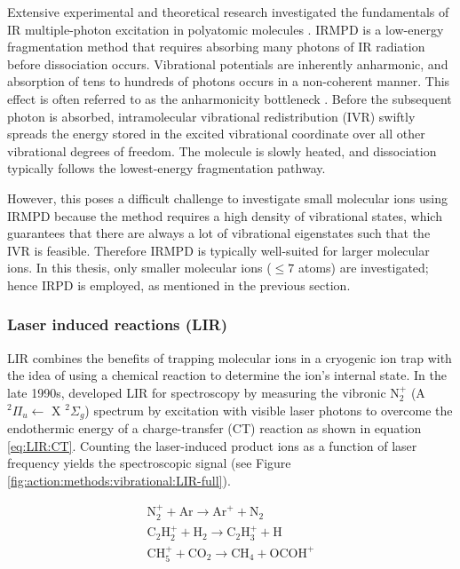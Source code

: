 Extensive experimental and theoretical research investigated the fundamentals of IR multiple-photon excitation in polyatomic molecules \cite{black_collisionless_1977, makarov_statistical_1998, oomens_gas-phase_2006, parneix_accurate_2013}. IRMPD is a low-energy fragmentation method that requires absorbing many photons of IR radiation before dissociation occurs. Vibrational potentials are inherently anharmonic, and absorption of tens to hundreds of photons occurs in a non-coherent manner. This effect is often referred to as the anharmonicity bottleneck \cite{steinfeld_molecules_1985}. Before the subsequent photon is absorbed, intramolecular vibrational redistribution (IVR) swiftly spreads the energy stored in the excited vibrational coordinate over all other vibrational degrees of freedom. The molecule is slowly heated, and dissociation typically follows the lowest-energy fragmentation pathway. 

However, this poses a difficult challenge to investigate small molecular ions using IRMPD because the method requires a high density of vibrational states, which guarantees that there are always a lot of vibrational eigenstates such that the IVR is feasible. Therefore IRMPD is typically well-suited for larger molecular ions. In this thesis, only smaller molecular ions ($\leq 7$ atoms) are investigated; hence IRPD is employed, as mentioned in the previous section.

\subsubsection{Laser induced reactions (LIR)}
\label{subsec:action:methods:vibrational:LIR}

LIR combines the benefits of trapping molecular ions in a cryogenic ion trap with the idea of using a chemical reaction to determine the ion's internal state. In the late 1990s, \citet{schlemmer_laser_1999} developed LIR for spectroscopy by measuring the vibronic N$_2^+$ (A $ ^2\Pi_u \leftarrow$ X $^2\Sigma_g$) spectrum by excitation with visible laser photons to overcome the endothermic energy of a charge-transfer (CT) reaction as shown in equation \ref{eq:LIR:CT}. Counting the laser-induced product ions as a function of laser frequency yields the spectroscopic signal (see Figure \ref{fig:action:methods:vibrational:LIR-full}).

\begin{align}
    \text{N}_2^+ + \text{Ar} \rightarrow \text{Ar}^+ + \text{N}_2 \label{eq:LIR:CT}\\
    \text{C}_2\text{H}_2^+ + \text{H}_2 \rightarrow \text{C}_2\text{H}_3^+ + \text{H} \label{eq:LIR:H2_abstraction}\\
    \text{CH}_5^+ + \text{CO}_2 \rightarrow \text{CH}_4 + \text{OCOH}^+  \label{eq:LIR:proton_transfer}
\end{align}

